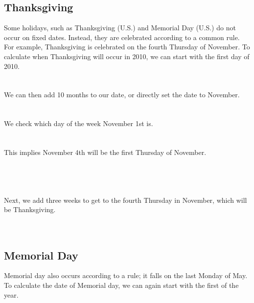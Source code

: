\documentclass[article]{jss}
\begin{document}
\subsection{Thanksgiving}
Some holidays, such as Thanksgiving (U.S.) and Memorial Day (U.S.) do not occur on fixed dates. Instead, they are celebrated according to a common rule. For example, Thanksgiving is celebrated on the fourth Thursday of November. To calculate when Thanksgiving will occur in 2010, we can start with the first day of 2010.\\

\\
\\

We can then add 10 months to our date, or directly set the date to November.\\

\\
\\

We check which day of the week November 1st is.\\

\\
\\

This implies November 4th will be the first Thursday of November.\\

\\
\\
\\
\\

Next, we add three weeks to get to the fourth Thursday in November, which will be Thanksgiving.\\

\\
\\

\subsection{Memorial Day}
Memorial day also occurs according to a rule; it falls on the last Monday of May. To calculate the date of Memorial day, we can again start with the first of the year.\\
\end{document}
